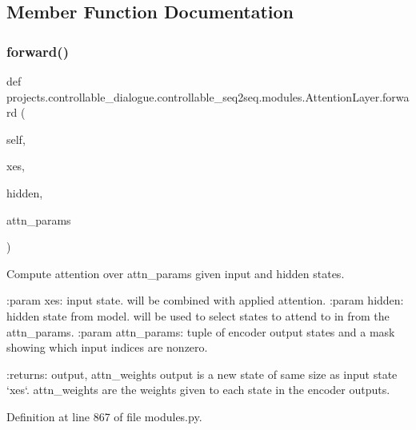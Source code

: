 \subsection{Member Function Documentation}
\mbox{\label{classprojects_1_1controllable__dialogue_1_1controllable__seq2seq_1_1modules_1_1AttentionLayer_a18edcb2fb56e109d42db47ba411811b9}} 
\subsubsection{\texorpdfstring{forward()}{forward()}}
{\footnotesize\ttfamily def projects.\+controllable\+\_\+dialogue.\+controllable\+\_\+seq2seq.\+modules.\+Attention\+Layer.\+forward (\begin{DoxyParamCaption}\item[{}]{self,  }\item[{}]{xes,  }\item[{}]{hidden,  }\item[{}]{attn\+\_\+params }\end{DoxyParamCaption})}

\begin{DoxyVerb}Compute attention over attn_params given input and hidden states.

:param xes:         input state. will be combined with applied
            attention.
:param hidden:      hidden state from model. will be used to select
            states to attend to in from the attn_params.
:param attn_params: tuple of encoder output states and a mask showing
            which input indices are nonzero.

:returns: output, attn_weights
  output is a new state of same size as input state `xes`.
  attn_weights are the weights given to each state in the
  encoder outputs.
\end{DoxyVerb}
 

Definition at line 867 of file modules.\+py.


